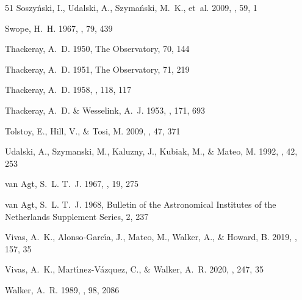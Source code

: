 \documentclass{mem}
\begin{document}
\begin{thebibliography}{51}
{Soszy{\'n}ski}, I., {Udalski}, A., {Szyma{\'n}ski}, M.~K., {et~al.} 2009,
  \actaa, 59, 1

{Swope}, H.~H. 1967, \pasp, 79, 439

{Thackeray}, A.~D. 1950, The Observatory, 70, 144

{Thackeray}, A.~D. 1951, The Observatory, 71, 219

{Thackeray}, A.~D. 1958, \mnras, 118, 117

{Thackeray}, A.~D. \& {Wesselink}, A.~J. 1953, \nat, 171, 693

{Tolstoy}, E., {Hill}, V., \& {Tosi}, M. 2009, \araa, 47, 371

{Udalski}, A., {Szymanski}, M., {Kaluzny}, J., {Kubiak}, M., \& {Mateo}, M.
  1992, \actaa, 42, 253

{van Agt}, S.~L. T.~J. 1967, \bain, 19, 275

{van Agt}, S.~L. T.~J. 1968, Bulletin of the Astronomical Institutes of the
  Netherlands Supplement Series, 2, 237

{Vivas}, A.~K., {Alonso-Garc{\'\i}a}, J., {Mateo}, M., {Walker}, A., \&
  {Howard}, B. 2019, \aj, 157, 35

{Vivas}, A.~K., {Mart{\'\i}nez-V{\'a}zquez}, C., \& {Walker}, A.~R. 2020,
  \apjs, 247, 35

{Walker}, A.~R. 1989, \aj, 98, 2086


\end{thebibliography}
\end{document}
